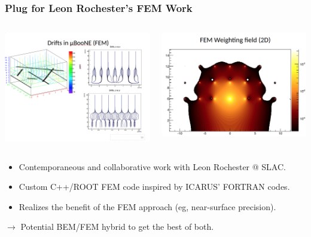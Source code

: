 \documentclass[xcolor=dvipsnames]{beamer}
\begin{document}
\begin{frame}
  \frametitle{Plug for Leon Rochester's FEM Work}
  \begin{columns}
    \begin{column}{0.5\textwidth}
      \begin{center}
        \includegraphics[width=\textwidth]{leon-drifts.png}
      \end{center}
    \end{column}
    \begin{column}{0.5\textwidth}
      \begin{center}
        \includegraphics[width=\textwidth]{leon-weighting.png}        
      \end{center}
    \end{column}
  \end{columns}
  \begin{itemize}\footnotesize
  \item Contemporaneous and collaborative work with Leon Rochester @ SLAC.
  \item Custom C++/ROOT FEM code inspired by ICARUS' FORTRAN codes.
  \item Realizes the benefit of the FEM approach (eg, near-surface precision).
  \end{itemize}
  $\rightarrow$ Potential BEM/FEM hybrid to get the best of both.
\end{frame}
\end{document}
